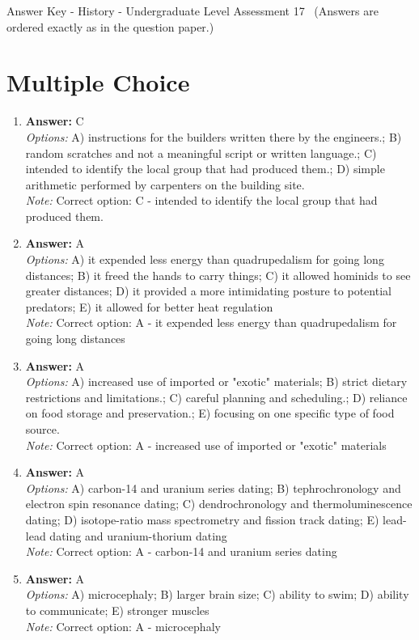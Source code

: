 \documentclass[12pt]{article}
\begin{document}
\begin{center}
Answer Key - History - Undergraduate Level Assessment 17 \
\small (Answers are ordered exactly as in the question paper.)
\end{center}

\section*{Multiple Choice}
\begin{enumerate}[label=\arabic*.]
\item \textbf{Answer:} C
\\ \textit{Options:} A) instructions for the builders written there by the engineers.; B) random scratches and not a meaningful script or written language.; C) intended to identify the local group that had produced them.; D) simple arithmetic performed by carpenters on the building site.
\\ \textit{Note:} Correct option: C - intended to identify the local group that had produced them.
\item \textbf{Answer:} A
\\ \textit{Options:} A) it expended less energy than quadrupedalism for going long distances; B) it freed the hands to carry things; C) it allowed hominids to see greater distances; D) it provided a more intimidating posture to potential predators; E) it allowed for better heat regulation
\\ \textit{Note:} Correct option: A - it expended less energy than quadrupedalism for going long distances
\item \textbf{Answer:} A
\\ \textit{Options:} A) increased use of imported or "exotic" materials; B) strict dietary restrictions and limitations.; C) careful planning and scheduling.; D) reliance on food storage and preservation.; E) focusing on one specific type of food source.
\\ \textit{Note:} Correct option: A - increased use of imported or "exotic" materials
\item \textbf{Answer:} A
\\ \textit{Options:} A) carbon-14 and uranium series dating; B) tephrochronology and electron spin resonance dating; C) dendrochronology and thermoluminescence dating; D) isotope-ratio mass spectrometry and fission track dating; E) lead-lead dating and uranium-thorium dating
\\ \textit{Note:} Correct option: A - carbon-14 and uranium series dating
\item \textbf{Answer:} A
\\ \textit{Options:} A) microcephaly; B) larger brain size; C) ability to swim; D) ability to communicate; E) stronger muscles
\\ \textit{Note:} Correct option: A - microcephaly
\end{enumerate}
\end{document}
